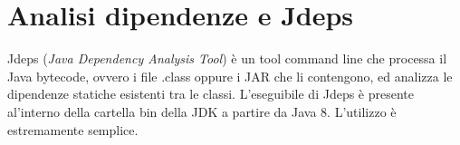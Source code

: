 \chapter{Analisi dipendenze e Jdeps}
Jdeps (\textit{Java Dependency Analysis Tool}) è un tool command line che processa il Java bytecode, ovvero i file .class oppure i JAR che li contengono, ed analizza le dipendenze statiche esistenti tra le classi. L'eseguibile di Jdeps è presente al'interno della cartella bin della JDK a partire da Java 8. L'utilizzo è estremamente semplice. 